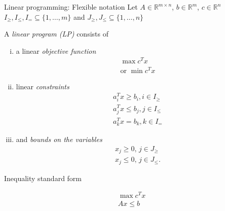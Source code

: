 \begin{frame}{Linear programming: Flexible notation}
Let  $A \in ℝ^{m\times n}$, $b \in ℝ^{m}$, $c \in ℝ^n$ 
$I_\geq,I_\leq,I_= \subseteq \{1,\ldots,m\}$
and $J_\geq,J_\leq \subseteq\{1,\ldots,n\}$


\medskip 
A \emph{linear program (LP)}
consists of 
\begin{enumerate}[i)]
\item a linear \emph{objective function}
  \begin{displaymath}
    \begin{array}{c}
      \max c^T x \\
      \text{or } \min c^Tx
    \end{array}
  \end{displaymath}
\item linear \emph{constraints} 
  \begin{displaymath}
    \begin{array}{c}
      a_i^T x \geq b_i, i \in {I_\geq} \\ 
      a_j^T x \leq b_j, j \in {I_\leq} \\ 
      a_k^T x = b_k, k \in {I_=} 
    \end{array}
  \end{displaymath}
\item and  \emph{bounds on the variables} 
  \begin{displaymath}
    \begin{array}{c}
      x_j \geq0, \, j \in J_\geq \\
      x_j \leq0, \, j \in J_\leq. 
    \end{array}
  \end{displaymath}
\end{enumerate}


\end{frame}



\begin{frame}{Inequality standard form}

  \begin{displaymath}
    \begin{array}{l}
      \max c^T x \\
      Ax  ≤  b 
    \end{array}
  \end{displaymath}
  
\end{frame}



